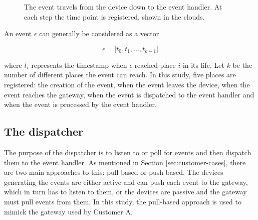 \begin{figure}[h!]
    \centering
    \caption{The event travels from the device down to the event handler. At
    each step the time point is registered, shown in the clouds.}
    \label{fig:event-life}
\end{figure}

An event $\epsilon$ can generally be considered as a vector

$$
\epsilon = \big[ t_0, t_1, ..., t_{k-1} \big]
$$

where $t_i$ represents the timestamp when $\epsilon$ reached place $i$ in its
life. Let $k$ be the number of different places the event can reach. In this
study, five places are registered: the creation of the event, when the event
leaves the device, when the event reaches the gateway, when the event is
dispatched to the event handler and when the event is processed by the event
handler.

\subsection{The dispatcher}

The purpose of the dispatcher is to listen to or poll for events and then
dispatch them to the event handler. As mentioned in Section
\ref{sec:customer-cases}, there are two main approaches to this: pull-based or
push-based. The devices generating the events are either active and can push
each event to the gateway, which in turn has to listen to them, or the devices
are passive and the gateway must pull events from them. In this study, the
pull-based approach is used to mimick the gateway used by Customer A.

